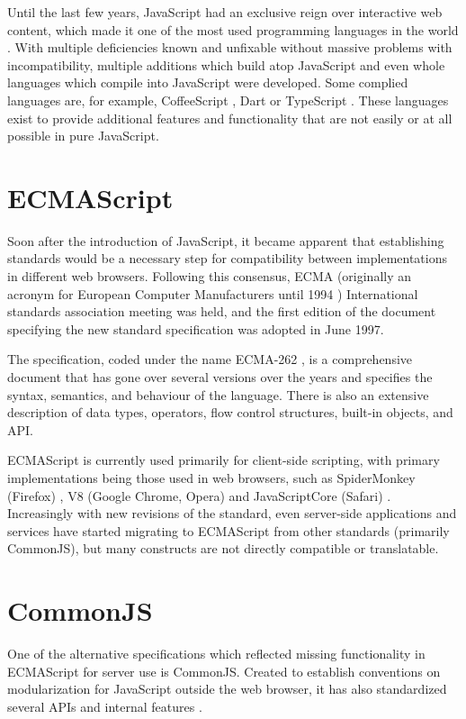 Until the last few years, JavaScript had an exclusive reign over interactive web
content, which made it one of the most used programming languages in the world
\cite{stack-overflow-survey}. With multiple deficiencies known and unfixable
without massive problems with incompatibility, multiple additions which build
atop JavaScript and even whole languages which compile into JavaScript were
developed. Some complied languages are, for example, CoffeeScript
\cite{coffeescript-homepage}, Dart \cite{dart-homepage} or TypeScript
\cite{typescript-homepage}. These languages exist to provide additional features
and functionality that are not easily or at all possible in pure JavaScript.


\section*{ECMAScript}
Soon after the introduction of JavaScript, it became apparent that establishing
standards would be a necessary step for compatibility between implementations in
different web browsers. Following this consensus, ECMA (originally an acronym
for European Computer Manufacturers until 1994 \cite{ecma-mission})
International standards association meeting was held, and the first edition of
the document specifying the new standard specification was adopted in June 1997.

The specification, coded under the name ECMA-262 \cite{ecma-262}, is a
comprehensive document that has gone over several versions over the years and
specifies the syntax, semantics, and behaviour of the language. There is also an
extensive description of data types, operators, flow control structures,
built-in objects, and API.

ECMAScript is currently used primarily for client-side scripting, with primary
implementations being those used in web browsers, such as SpiderMonkey (Firefox)
\cite{spidermonkey-documentation}, V8 (Google Chrome, Opera) \cite{v8-homepage}
and JavaScriptCore (Safari) \cite{javascript-core}. Increasingly with new
revisions of the standard, even server-side applications and services have
started migrating to ECMAScript from other standards (primarily CommonJS), but
many constructs are not directly compatible or translatable.


\section*{CommonJS}
One of the alternative specifications which reflected missing functionality in
ECMAScript for server use is CommonJS. Created to establish conventions on
modularization for JavaScript outside the web browser, it has also standardized
several APIs and internal features \cite{commonjs-spec}. 

